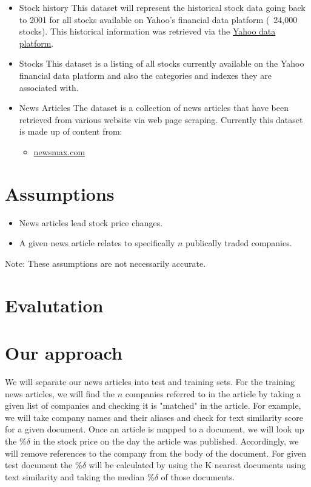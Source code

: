 \documentclass[11pt,letterpaper]{article}
\newcommand{\blue}[1]{\textcolor{RoyalBlue}{#1}}
\newcommand{\instructions}[1]{\blue{\textit{#1}}}
\renewcommand{\instructions}[1]{}
\begin{document}
  \begin{itemize}
  	\item Stock history
		This dataset will represent the historical stock data going back to 2001 for all stocks available on Yahoo's financial data platform (~24,000 stocks). This historical information was retrieved via the  \href{https://developer.yahoo.com/yql}{Yahoo data platform}.
	\item Stocks
		This dataset is a listing of all stocks currently available on the Yahoo financial data platform and also the categories and indexes they are associated with.
	\item News Articles
		The dataset is a collection of news articles that have been retrieved from various website via web page scraping.  Currently this dataset is made up of content from:
		\begin{itemize}
			\item \href{http://www.newsmax.com/archives/}{newsmax.com}
		\end{itemize}
  \end{itemize}
  
\section*{Assumptions}
  \begin{itemize}
  \item News articles lead stock price changes.
  \item A given news article relates to specifically $n$ publically traded companies.
  \end{itemize}
  Note: These assumptions are not necessarily accurate.
  
\instructions{Do you have data to train and test your system on? How
  will you evaluate your system?}
  
\section*{Evalutation}


\section*{Our approach}
  We will separate our news articles into test and training sets. For the training news
  articles, we will find the $n$ companies referred to in the article by taking a given
  list of companies and checking it is "matched" in the article. For example, we will
  take company names and their aliases and check for text similarity score for a given
  document. Once an article is mapped to a document, we will look up the $\%\delta$ in
  the stock price on the day the article was published. Accordingly, we will remove references
  to the company from the body of the document. For given test document the $\%\delta$
  will be calculated by using the K nearest documents using text similarity
  and taking the median $\%\delta$ of those documents.
\instructions{Describe how you want to tackle this task}
\end{document}

